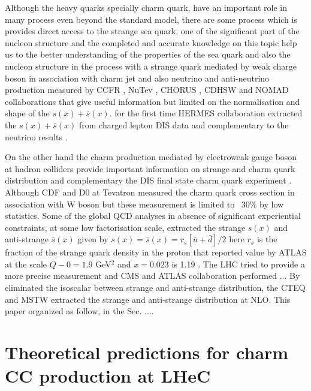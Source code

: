 \documentclass[pdftex,twocolumn,epjc3]{svjour3}          %
\begin{document}
 Although the heavy quarks specially charm quark, have an important role in many process even beyond the standard model, there are some process which is provides direct access to the strange sea quark, one of the significant part of the nucleon structure and  the completed and accurate knowledge on this topic help us to the better understanding of the properties of the sea quark and also the nucleon structure in the process with a strange quark mediated by weak charge boson in association with charm jet \cite{Abazov:2014fka, Lai:2007dq} and also neutrino and anti-neutrino production measured by CCFR \cite{Seligman:1997mc}, NuTev \cite{Tzanov:2005kr}, CHORUS \cite{Onengut:2005kv}, CDHSW \cite{Berge:1989hr} and NOMAD \cite{Samoylov:2013xoa} collaborations that give useful information but limited on the normalisation and shape of the $s(x)+ \bar{s}(x)$. for the first time HERMES collaboration extracted the $s(x)+ \bar{s}(x)$ from charged lepton DIS data and complementary to the neutrino results \cite{Airapetian:2008qf}.

On the other hand the charm production mediated by electroweak gauge boson at hadron colliders provide important information on strange and charm quark distribution and complementary the DIS final state charm quark experiment \cite{Lai:2007dq}. Although CDF and D0 at Tevatron \cite{Aaltonen:2007dm, Abazov:2008qz} measured the charm quark cross section in association with W boson but these measurement is limited to ~30\% by low statistics. 
Some of the global QCD analyses in absence of significant experiential constraints, at some low factorisation scale, extracted the strange $s(x)$ and anti-strange $\bar{s}(x)$ given by 
$s(x)= \bar{s}(x)=r_s[\bar{u}+\bar{d}]/2$ \cite{Kretzer:2003it, Martin:2004ir} here $r_s$ is the fraction of the strange quark density in the proton that reported value by ATLAS at the scale $Q-0 = 1.9$ GeV$^2$ and $x= 0.023$ is  1.19 \cite{Aaboud:2016btc}. The LHC tried to provide a more precise measurement and CMS and ATLAS collaboration performed ... By eliminated the isoscalar between strange and anti-strange distribution, the CTEQ \cite{Lai:2007dq} and MSTW \cite{Martin:2009iq} extracted the strange and anti-strange distribution at NLO. 
This paper organized as follow, in the Sec. ....
 

\section{Theoretical predictions for charm CC production at LHeC}
\label{sec:thpred}
\end{document}
